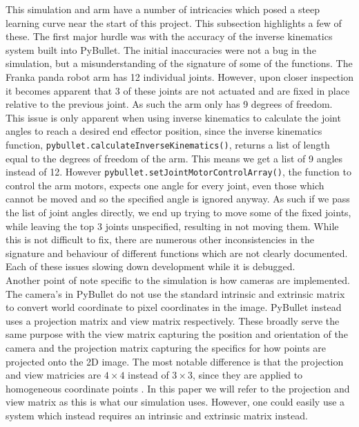 This simulation and arm have a number of intricacies which posed a steep learning curve near the start of this project. This subsection highlights a few of these. The first major hurdle was with the accuracy of the inverse kinematics system built into PyBullet. The initial inaccuracies were not a bug in the simulation, but a misunderstanding of the signature of some of the functions.
The Franka panda robot arm has 12 individual joints. However, upon closer inspection it becomes apparent that 3 of these joints are not actuated and are fixed in place relative to the previous joint. As such the arm only has 9 degrees of freedom. This issue is only apparent when using inverse kinematics to calculate the joint angles to reach a desired end effector position, since the inverse kinematics function, \verb|pybullet.calculateInverseKinematics()|, returns a list of length equal to the degrees of freedom of the arm. This means we get a list of 9 angles instead of 12. However \verb|pybullet.setJointMotorControlArray()|, the function to control the arm motors, expects one angle for every joint, even those which cannot be moved and so the specified angle is ignored anyway. As such if we pass the list of joint angles directly, we end up trying to move some of the fixed joints, while leaving the top 3 joints unspecified, resulting in not moving them. While this is not difficult to fix, there are numerous other inconsistencies in the signature and behaviour of different functions which are not clearly documented. Each of these issues slowing down development while it is debugged.\\

Another point of note specific to the simulation is how cameras are implemented. The camera's in PyBullet do not use the standard intrinsic and extrinsic matrix to convert world coordinate to pixel coordinates in the image. PyBullet instead uses a projection matrix and view matrix respectively. These broadly serve the same purpose with the view matrix capturing the position and orientation of the camera and the projection matrix capturing the specifics for how points are projected onto the 2D image. The most notable difference is that the projection and view matricies are $4\times4$ instead of $3\times3$, since they are applied to homogeneous coordinate points \cite{homogenous-coords}. In this paper we will refer to the projection and view matrix as this is what our simulation uses. However, one could easily use a system which instead requires an intrinsic and extrinsic matrix instead.\\


